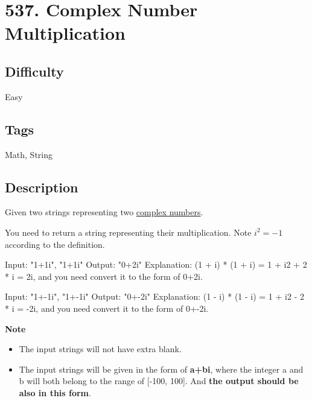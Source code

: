 \tocless\section{537. Complex Number Multiplication}
\label{algo:537}

\subsection*{Difficulty}
Easy

\subsection*{Tags}
Math, String

\subsection*{Description}
Given two strings representing two \href{https://en.wikipedia.org/wiki/Complex_number}{complex numbers}.

You need to return a string representing their multiplication. Note $i^2 = -1$ according to the definition.

\begin{example}
\begin{multilinecode}
Input: "1+1i", "1+1i"
Output: "0+2i"
Explanation: (1 + i) * (1 + i) = 1 + i2 + 2 * i = 2i, and you need convert it to the form of 0+2i.
\end{multilinecode}
\end{example}

\begin{example}
\begin{multilinecode}
Input: "1+-1i", "1+-1i"
Output: "0+-2i"
Explanation: (1 - i) * (1 - i) = 1 + i2 - 2 * i = -2i, and you need convert it to the form of 0+-2i.
\end{multilinecode}
\end{example}

\textbf{Note}
\begin{itemize}
    \item The input strings will not have extra blank.
    \item The input strings will be given in the form of \textbf{a+bi}, where the integer a and b will both belong to the range of [-100, 100]. And \textbf{the output should be also in this form}.
\end{itemize}

